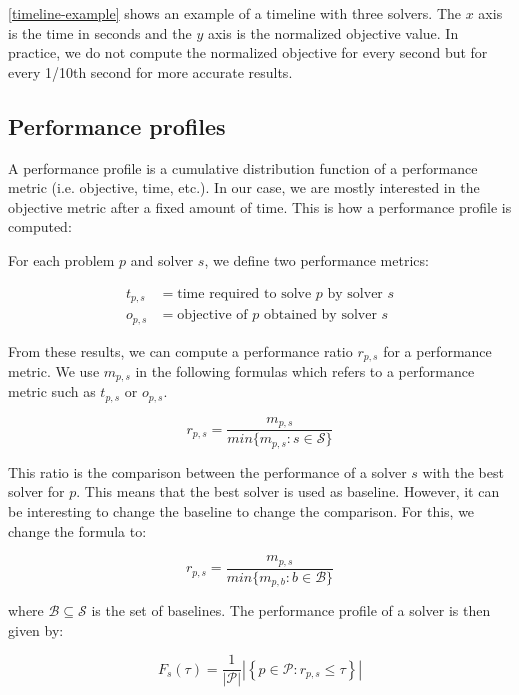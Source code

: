 \documentclass[../../thesis.tex]{subfiles}
\begin{document}
\autoref{timeline-example} shows an example of a timeline with three solvers. The $x$ axis is the time in seconds and the $y$ axis is the normalized objective 
value. In practice, we do not compute the normalized objective for every second but for every 1/10th second for more accurate results.



\subsection{Performance profiles}

A performance profile \cite{Dolan2002} is a cumulative distribution function of a performance metric (i.e. objective, time, etc.).
In our case, we are mostly interested in the objective metric after a fixed amount of time.
This is how a performance profile is computed:

For each problem $p$ and solver $s$, we define two performance metrics:

\begin{align*}
  t_{p, s} &= \text{time required to solve $p$ by solver $s$} \\
  o_{p, s} &= \text{objective of $p$ obtained by solver $s$}
\end{align*}


From these results, we can compute a performance ratio $r_{p, s}$ for a performance metric.
We use $m_{p, s}$ in the following formulas which refers to a performance metric such as $t_{p, s}$ or $o_{p, s}$.

\begin{equation}
  r_{p, s} = \frac{m_{p, s}}{min\{ m_{p, s} : s \in \mathcal{S} \}}
\end{equation}

This ratio is the comparison between the performance of a solver $s$ with the best solver for $p$.
This means that the best solver is used as baseline. However, it can be interesting to change 
the baseline to change the comparison. For this, we change the formula \cite{Cauwelaert2017AVW} to:

\begin{equation}
  r_{p, s} = \frac{m_{p, s}}{min\{ m_{p, b} : b \in \mathcal{B} \} }
\end{equation}

where $\mathcal{B} \subseteq \mathcal{S}$ is the set of baselines.
The performance profile of a solver is then given by:


\begin{equation}
  F_s(\tau) = \frac{1}{|\mathcal{P}|} \left| \left\{ p \in \mathcal{P} : r_{p, s} \leq \tau \right\} \right|
\end{equation}
\end{document}

